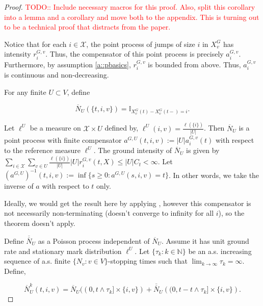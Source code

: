 \documentclass[12pt]{article}
\newcommand{\mb}{\mathbb}
\newcommand{\mc}{\mathcal}
\newcommand{\ra}{\rightarrow}
\newcommand{\ov}{\overline}
\newcommand{\tr}{\textcolor{red}}
\newcommand{\ind}{\hspace{24pt}}
\newcommand{\defeq}{:=}								%
\newcommand{\sta}{\mc{X}}							%
\newcommand{\Xf}{X}									%
\newcommand{\poiss}{N}								%
\newcommand{\Sm}{\ell}								%
\newcommand{\rate}{r}								%
\newcommand{\poissv}[1]{_{#1}}						%
\newcommand{\vind}[1]{_{#1}}						%
\newcommand{\tme}[1]{(#1)}							%
\newcommand{\gind}[1]{^{#1}}						%
\newcommand{\vpara}[1]{^{#1}}						%
\newcommand{\stpara}[1]{_{#1}}						%
\newcommand{\gvpara}[2]{^{#1,#2}}					%
\newcommand{\jumpbd}[1]{C_{#1}}						%
\newcommand{\tmepro}[2]{(#1,#2)}					%
\newcommand{\compen}{a}								%
\newcommand{\binver}[1]{(#1)^{-1}}					%
\newcommand{\rt}{\tau}								%
\begin{document}
\begin{proof}
\tr{TODO:: Include necessary macros for this proof. Also, split this corollary into a lemma and a corollary and move both to the appendix. This is turning out to be a technical proof that distracts from the paper.}

Notice that for each \(i\in \sta\), the point process of jumps of size \(i\) in \(\Xf\gind{G}\vind{v}\) has intensity \(\rate\gvpara{G}{v}\stpara{i}\). Thus, the compensator of this point process is precisely \(\compen\gvpara{G}{v}\stpara{i}\). Furthermore, by assumption \ref{a::pbasics}, \(\rate\gvpara{G}{v}\stpara{i}\) is bounded from above. Thus, \(\compen\gvpara{G}{v}\stpara{i}\) is continuous and non-decreasing.

For any finite \(U \subset V\), define

\[\ov{\poiss}\poissv{U}(\{t,i,v\}) = \mb{I}_{\Xf\gind{G}\vind{v}\tme{t} - \Xf\gind{G}\vind{v}\tme{t-} = i}.\]

\ind Let \(\Sm\vpara{U}\) be a measure on \(\sta\times U\) defined by, \(\Sm\vpara{U}(i,v) = \frac{\Sm(\{i\})}{|U|}\). Then \(\ov{\poiss}\poissv{U}\) is a point process with finite compensator \(\compen\gvpara{G}{U}(t,i,v) \defeq |U|\compen\gvpara{G}{v}\stpara{i}\tme{t}\) with respect to the reference measure \(\Sm\vpara{U}\). The ground intensity of \(\ov{\poiss}\poissv{U}\) is given by \(\sum_{i\in \sta}\sum_{v\in U}\frac{\Sm(\{i\})}{|U|}|U|\rate\gvpara{G}{v}\stpara{i}\tmepro{t}{\Xf} \leq |U|\jumpbd{t} < \infty\). Let \(\binver{\compen\gvpara{G}{U}}(t,i,v) \defeq \inf\{s \geq 0: \compen\gvpara{G}{U}(s,i,v) = t\}\). In other words, we take the inverse of \(\compen\) with respect to \(t\) only.

\ind Ideally, we would get the result here by applying \cite[Theorem 14.6.IV]{DalVer08}, however this compensator is not necessarily non-terminating (doesn't converge to infinity for all \(i\)), so the theorem doesn't apply. 

\ind Define \(\ov{\ov{\poiss}}\poissv{U}\) as a Poisson process independent of \(\ov{\poiss}\poissv{U}\). Assume it has unit ground rate and stationary mark distribution \(\Sm\vpara{U}\). Let \(\{\tau_k:k\in\mb{N}\}\) be an a.s. increasing sequence of a.s. finite \(\{\poiss\poissv{v}:v \in V\}\)-stopping times such that \(\lim_{k \ra \infty} \rt_k = \infty\). Define,

\[\ov{\poiss}\poissv{U}^k(t,i,v) = \ov{\poiss}\poissv{U}((0,t\wedge\tau_k]\times\{i,v\}) + \ov{\ov{\poiss}}\poissv{U}\left((0,t - t\wedge\tau_k]\times\{i,v\}\right).\]


\end{proof}
\end{document}
